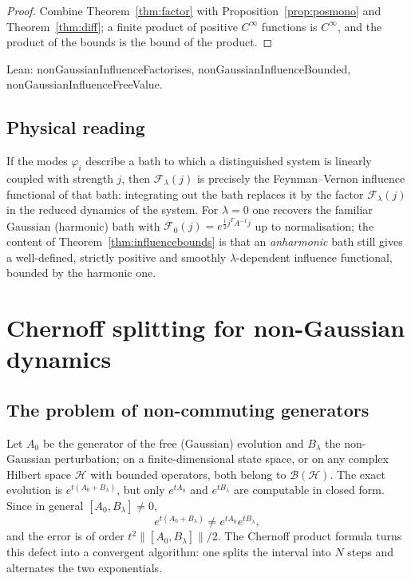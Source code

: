 \documentclass[11pt,a4paper]{article}
\theoremstyle{plain}
\theoremstyle{definition}
\theoremstyle{remark}
\let\leanoldunderscore\_
\newcommand{\leanbreakunderscore}{\leanoldunderscore\allowbreak}
\newcommand{\lean}[1]{{\ttfamily\hyphenchar\font=-1\relax
  \let\_\leanbreakunderscore #1}}
\begin{document}
\begin{proof}
Combine Theorem~\ref{thm:factor} with Proposition~\ref{prop:posmono} and
Theorem~\ref{thm:diff}; a finite product of positive $C^{\infty}$ functions is
$C^{\infty}$, and the product of the bounds is the bound of the product.
\end{proof}

Lean: \lean{nonGaussianInfluenceFactorises}, \lean{nonGaussianInfluenceBounded},
\lean{nonGaussianInfluenceFreeValue}.

\subsection{Physical reading}

If the modes $\varphi_i$ describe a bath to which a distinguished system is linearly
coupled with strength $j$, then $\mathcal{F}_\lambda(j)$ is precisely the
Feynman--Vernon influence functional of that bath: integrating out the bath replaces it
by the factor $\mathcal{F}_\lambda(j)$ in the reduced dynamics of the system. For
$\lambda=0$ one recovers the familiar Gaussian (harmonic) bath with
$\mathcal{F}_0(j)=e^{\frac12 j^{T}A^{-1}j}$ up to normalisation; the content of
Theorem~\ref{thm:influencebounds} is that an \emph{anharmonic} bath still gives a
well-defined, strictly positive and smoothly $\lambda$-dependent influence functional,
bounded by the harmonic one.

\section{Chernoff splitting for non-Gaussian dynamics}
\label{sec:chernoff}

\subsection{The problem of non-commuting generators}

Let $A_0$ be the generator of the free (Gaussian) evolution and $B_\lambda$ the
non-Gaussian perturbation; on a finite-dimensional state space, or on any complex Hilbert
space $\mathcal{H}$ with bounded operators, both belong to $\mathcal{B}(\mathcal{H})$. The
exact evolution is $e^{t(A_0+B_\lambda)}$, but only $e^{tA_0}$ and $e^{tB_\lambda}$ are
computable in closed form. Since in general $[A_0,B_\lambda]\neq0$,
\[
e^{t(A_0+B_\lambda)}\neq e^{tA_0}e^{tB_\lambda},
\]
and the error is of order $t^{2}\|[A_0,B_\lambda]\|/2$. The Chernoff product formula
turns this defect into a convergent algorithm: one splits the interval into $N$ steps and
alternates the two exponentials.
\end{document}
